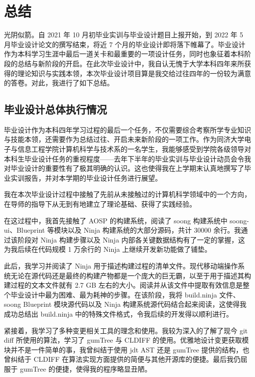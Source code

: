 \section{总结}\label{summary}

光阴似箭。自 2021 年 10 月初毕业实训与毕业设计题目上报开始，到 2022 年 5 月毕业设计论文的撰写结束，将近 7 个月的毕业设计即将落下帷幕了。毕业设计作为本科学习生涯中最后一道关卡和最重要的一项设计任务，同时也象征着本科阶段的总结与新阶段的开启。在此次毕业设计中，我自认无愧于大学本科四年来所获得的理论知识与实践本领，本次毕业设计项目算是我交给过往四年的一份较为满意的答卷。对此，我进行了如下总结。

\subsection{毕业设计总体执行情况}

毕业设计作为本科四年学习过程的最后一个任务，不仅需要综合考察所学专业知识与技能本领，还需要作为总结过往、开启未来新阶段的一项工作。作为同济大学电子与信息工程学院计算机科学与技术系的一名学生，我能够感受到学院各级领导对本科生毕业设计任务的重视程度——去年下半年的毕业实训与毕业设计动员会令我对毕业设计的重要性有了极其明确的认识。这也使得我在上学期末认真地撰写了毕业实训报告，并对本学期的毕业设计任务进行展望。

我在本次毕业设计过程中接触了先前从未接触过的计算机科学领域中的一个方向，在导师的指导下从无到有地建立了理论基础、获得了实践经验。

在这过程中，我首先接触了 AOSP 的构建系统，阅读了 soong 构建系统中 soong-ui、Blueprint 等模块以及 Ninja 构建系统的大部分源码，共计 30000 余行。我通过该阶段对 Ninja 构建步骤以及 Ninja 内部各关键数据结构有了一定的掌握，这为我后续在代码规模 1 万余行的 Ninja 上继续开发新功能做了铺垫。

此后，我学习并阅读了 Ninja 用于描述构建过程的清单文件。现代移动端操作系统无论在源代码还是最终的构建产物都是一个庞大的巨无霸，以至于用于描述其构建过程的文本文件就有 2.7 GB 左右的大小。阅读并从该文件中提取有效信息是整个毕业设计中最为困难、最为耗神的步骤。在该阶段，我将 build.ninja 文件、soong Blueprint 模块源代码以及 Ninja 构建系统源代码结合起来阅读，这使得我成功总结出 build.ninja 中的特殊文件格式，令我后续的开发得以顺利进行。

紧接着，我学习了多种变更相关工具的理念和使用。我较为深入的了解了现今 git diff 所使用的算法，学习了 gumTree 与 CLDIFF 的使用。优雅地设计变更获取模块并不是一件简单的事，我曾纠结于使用 jdt AST 还是 gumTree 提供的结构，也曾纠结于 CLDIFF 在算法实现方面提供的简便与其他开源库的便捷。最后我仍屈服于 gumTree 的便捷，使得我的程序略显丑陋。

